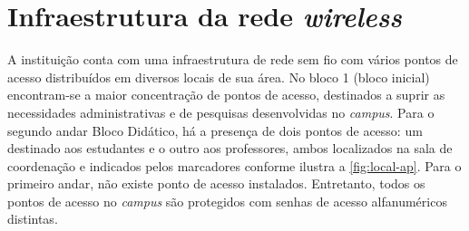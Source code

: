\begin{figure}[H]
	\centering
\end{figure}

\section{Infraestrutura da rede \textit{wireless}}
\label{sec:infraestrutura-wireless}

A instituição conta com uma infraestrutura de rede sem fio com vários pontos de acesso distribuídos em diversos locais de sua área. No bloco 1 (bloco inicial) encontram-se a maior concentração de pontos de acesso, destinados a suprir as necessidades administrativas e de pesquisas desenvolvidas no \textit{campus}. Para o segundo andar Bloco Didático, há a presença de dois pontos de acesso: um destinado aos estudantes e o outro aos professores, ambos localizados na sala de coordenação e indicados pelos marcadores conforme ilustra a \autoref{fig:local-ap}. Para o primeiro andar, não existe ponto de acesso instalados. Entretanto, todos os pontos de acesso no \textit{campus} são protegidos com senhas de acesso alfanuméricos distintas.

\begin{figure}[H]
	\centering
\end{figure}

